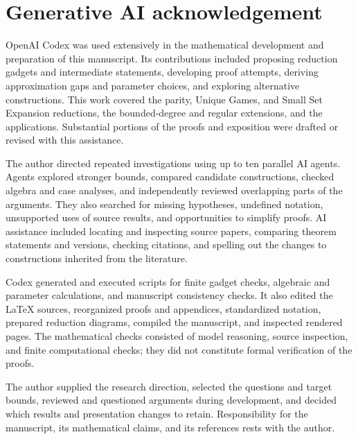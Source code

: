 \clearpage
\section*{Generative AI acknowledgement}
OpenAI Codex was used extensively in the mathematical development and
preparation of this manuscript. Its contributions included proposing
reduction gadgets and intermediate statements, developing proof attempts,
deriving approximation gaps and parameter choices, and exploring
alternative constructions. This work covered the parity, Unique Games,
and Small Set Expansion reductions, the bounded-degree and regular
extensions, and the applications. Substantial portions of the proofs and
exposition were drafted or revised with this assistance.

The author directed repeated investigations using up to ten parallel AI
agents. Agents explored stronger bounds, compared candidate constructions,
checked algebra and case analyses, and independently reviewed overlapping
parts of the arguments. They also searched for missing hypotheses,
undefined notation, unsupported uses of source results, and opportunities
to simplify proofs. AI assistance included locating and inspecting source
papers, comparing theorem statements and versions, checking citations, and
spelling out the changes to constructions inherited from the literature.

Codex generated and executed scripts for finite gadget checks, algebraic
and parameter calculations, and manuscript consistency checks. It also
edited the LaTeX sources, reorganized proofs and appendices, standardized
notation, prepared reduction diagrams, compiled the manuscript, and
inspected rendered pages. The mathematical checks consisted of model
reasoning, source inspection, and finite computational checks; they did
not constitute formal verification of the proofs.

The author supplied the research direction, selected the questions and
target bounds, reviewed and questioned arguments during development, and
decided which results and presentation changes to retain. Responsibility
for the manuscript, its mathematical claims, and its references rests
with the author.
